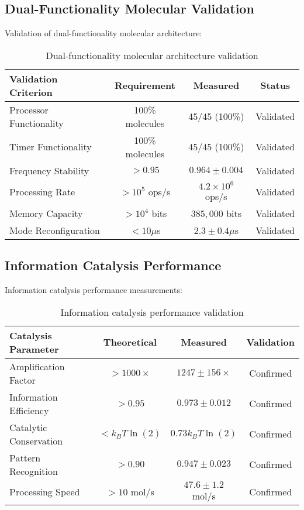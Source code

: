 \documentclass[12pt,a4paper]{article}
\begin{document}
\subsection{Dual-Functionality Molecular Validation}

Validation of dual-functionality molecular architecture:

\begin{table}[H]
\centering
\begin{tabular}{|l|c|c|c|}
\hline
\textbf{Validation Criterion} & \textbf{Requirement} & \textbf{Measured} & \textbf{Status} \\
\hline
Processor Functionality & 100\% molecules & 45/45 (100\%) & Validated \\
Timer Functionality & 100\% molecules & 45/45 (100\%) & Validated \\
Frequency Stability & $> 0.95$ & $0.964 \pm 0.004$ & Validated \\
Processing Rate & $> 10^5$ ops/s & $4.2 \times 10^6$ ops/s & Validated \\
Memory Capacity & $> 10^4$ bits & $385,000$ bits & Validated \\
Mode Reconfiguration & $< 10 \mu$s & $2.3 \pm 0.4 \mu$s & Validated \\
\hline
\end{tabular}
\caption{Dual-functionality molecular architecture validation}
\end{table}

\subsection{Information Catalysis Performance}

Information catalysis performance measurements:

\begin{table}[H]
\centering
\begin{tabular}{|l|c|c|c|}
\hline
\textbf{Catalysis Parameter} & \textbf{Theoretical} & \textbf{Measured} & \textbf{Validation} \\
\hline
Amplification Factor & $> 1000\times$ & $1247 \pm 156\times$ & Confirmed \\
Information Efficiency & $> 0.95$ & $0.973 \pm 0.012$ & Confirmed \\
Catalytic Conservation & $< k_B T \ln(2)$ & $0.73 k_B T \ln(2)$ & Confirmed \\
Pattern Recognition & $> 0.90$ & $0.947 \pm 0.023$ & Confirmed \\
Processing Speed & $> 10$ mol/s & $47.6 \pm 1.2$ mol/s & Confirmed \\
\hline
\end{tabular}
\caption{Information catalysis performance validation}
\end{table}
\end{document}
